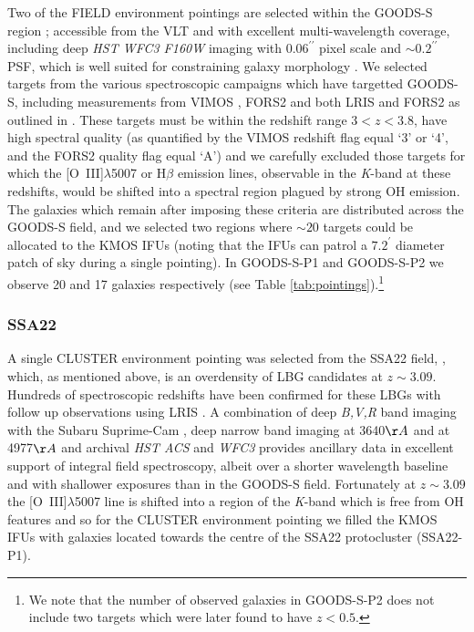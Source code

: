\documentclass[fleqn,usenatbib]{mn2e}
\begin{document}
Two of the FIELD environment pointings are selected within the GOODS-S region \citep{Guo2013}; accessible from the VLT and with excellent multi-wavelength coverage, including deep {\em HST WFC3 F160W} imaging with $ 0.06^{\prime\prime}$ pixel scale and $ \sim 0.2^{\prime\prime}$ PSF, which is well suited for constraining galaxy morphology \citep{Grogin2011,Koekemoer2011}.
We selected targets from the various spectroscopic campaigns which have targetted GOODS-S, including measurements from VIMOS \citep{Balestra2010,Cassata2014}, FORS2 \citep{Vanzella2005,Vanzella2006,Vanzella2008} and both LRIS and FORS2 as outlined in \cite{Wuyts2009}.
These targets must be within the redshift range $3 < z < 3.8$, have high spectral quality (as quantified by the VIMOS redshift flag equal `3' or `4', and the FORS2 quality flag equal `A') and we carefully excluded those targets for which the [O~{\sc III}]$\lambda$5007 or H$\beta$ emission lines, observable in the {\it K}-band at these redshifts, would be shifted into a spectral region plagued by strong OH emission.
The galaxies which remain after imposing these criteria are distributed across the GOODS-S field, and we selected two regions where $\sim 20$ targets could be allocated to the KMOS IFUs (noting that the IFUs can patrol a $7.2^{\prime}$ diameter patch of sky during a single pointing).
In GOODS-S-P1 and GOODS-S-P2 we observe 20 and 17 galaxies respectively (see Table \ref{tab:pointings}).\footnote{We note that the number of observed galaxies in GOODS-S-P2 does not include two targets which were later found to have $z < 0.5$.}

\subsubsection{SSA22}\label{subsubsec:sample_selection_ssa}
A single CLUSTER environment pointing was selected from the SSA22 field, \citep{Steidel1998,Steidel2000,Steidel2003,Shapley2003}, which, as mentioned above, is an overdensity of LBG candidates at $z \sim 3.09$.
Hundreds of spectroscopic redshifts have been confirmed for these LBGs with follow up observations using LRIS \citep{Shapley2003,Nestor2013}.
A combination of deep {\em B,V,R} band imaging with the Subaru Suprime-Cam \citep{Matsuda2004}, deep narrow band imaging at 3640$\AA$ \citep{Matsuda2004} and at 4977$\AA$ \citep{Nestor2011,Yamada2012a} and archival {\em HST ACS} and {\it WFC3} provides ancillary data in excellent support of integral field spectroscopy, albeit over a shorter wavelength baseline and with shallower exposures than in the GOODS-S field.
Fortunately at $z \sim 3.09$ the [O~{\sc III}]$\lambda$5007 line is shifted into a region of the {\it K}-band which is free from OH features and so for the CLUSTER environment pointing we filled the KMOS IFUs with galaxies located towards the centre of the SSA22 protocluster (SSA22-P1).
\end{document}
